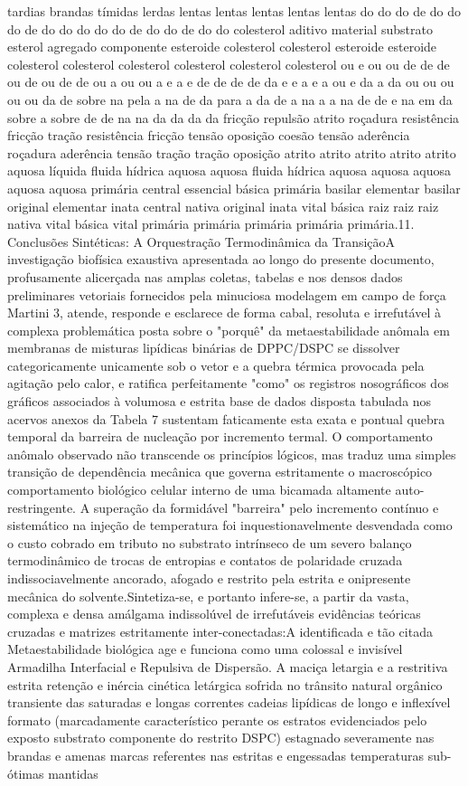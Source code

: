 tardias brandas tímidas lerdas lentas lentas lentas lentas lentas do do do de do do do de do do do do do de do do de do do colesterol aditivo material substrato esterol agregado componente esteroide colesterol colesterol esteroide esteroide colesterol colesterol colesterol colesterol colesterol colesterol ou e ou ou de de de ou de ou de de ou a ou ou a e a e de de de de da e e a e a ou e da a da ou ou ou ou ou da de sobre na pela a na de da para a da de a na a a na de de e na em da sobre a sobre de de na na da da da da fricção repulsão atrito roçadura resistência fricção tração resistência fricção tensão oposição coesão tensão aderência roçadura aderência tensão tração tração oposição atrito atrito atrito atrito atrito aquosa líquida fluida hídrica aquosa aquosa fluida hídrica aquosa aquosa aquosa aquosa aquosa primária central essencial básica primária basilar elementar basilar original elementar inata central nativa original inata vital básica raiz raiz raiz nativa vital básica vital primária primária primária primária primária.11. Conclusões Sintéticas: A Orquestração Termodinâmica da TransiçãoA investigação biofísica exaustiva apresentada ao longo do presente documento, profusamente alicerçada nas amplas coletas, tabelas e nos densos dados preliminares vetoriais fornecidos pela minuciosa modelagem em campo de força Martini 3, atende, responde e esclarece de forma cabal, resoluta e irrefutável à complexa problemática posta sobre o "porquê" da metaestabilidade anômala em membranas de misturas lipídicas binárias de DPPC/DSPC se dissolver categoricamente unicamente sob o vetor e a quebra térmica provocada pela agitação pelo calor, e ratifica perfeitamente "como" os registros nosográficos dos gráficos associados à volumosa e estrita base de dados disposta tabulada nos acervos anexos da Tabela 7 sustentam faticamente esta exata e pontual quebra temporal da barreira de nucleação por incremento termal. O comportamento anômalo observado não transcende os princípios lógicos, mas traduz uma simples transição de dependência mecânica que governa estritamente o macroscópico comportamento biológico celular interno de uma bicamada altamente auto-restringente. A superação da formidável "barreira" pelo incremento contínuo e sistemático na injeção de temperatura foi inquestionavelmente desvendada como o custo cobrado em tributo no substrato intrínseco de um severo balanço termodinâmico de trocas de entropias e contatos de polaridade cruzada indissociavelmente ancorado, afogado e restrito pela estrita e onipresente mecânica do solvente.Sintetiza-se, e portanto infere-se, a partir da vasta, complexa e densa amálgama indissolúvel de irrefutáveis evidências teóricas cruzadas e matrizes estritamente inter-conectadas:A identificada e tão citada Metaestabilidade biológica age e funciona como uma colossal e invisível Armadilha Interfacial e Repulsiva de Dispersão. A maciça letargia e a restritiva estrita retenção e inércia cinética letárgica sofrida no trânsito natural orgânico transiente das saturadas e longas correntes cadeias lipídicas de longo e inflexível formato (marcadamente característico perante os estratos evidenciados pelo exposto substrato componente do restrito DSPC) estagnado severamente nas brandas e amenas marcas referentes nas estritas e engessadas temperaturas sub-ótimas mantidas 
